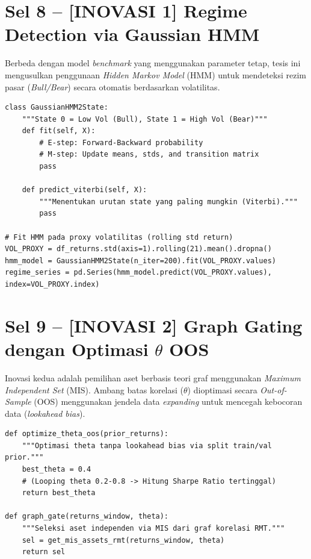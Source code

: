 \documentclass[12pt,a4paper]{article}
\begin{document}
\section{Sel 8 -- [INOVASI 1] Regime Detection via Gaussian HMM}
Berbeda dengan model \textit{benchmark} yang menggunakan parameter tetap, tesis ini mengusulkan penggunaan \textit{Hidden Markov Model} (HMM) untuk mendeteksi rezim pasar (\textit{Bull/Bear}) secara otomatis berdasarkan volatilitas.

\begin{lstlisting}[caption={Implementasi Gaussian HMM 2-state (Baum-Welch)}]
class GaussianHMM2State:
    """State 0 = Low Vol (Bull), State 1 = High Vol (Bear)"""
    def fit(self, X):
        # E-step: Forward-Backward probability
        # M-step: Update means, stds, and transition matrix
        pass

    def predict_viterbi(self, X):
        """Menentukan urutan state yang paling mungkin (Viterbi)."""
        pass

# Fit HMM pada proxy volatilitas (rolling std return)
VOL_PROXY = df_returns.std(axis=1).rolling(21).mean().dropna()
hmm_model = GaussianHMM2State(n_iter=200).fit(VOL_PROXY.values)
regime_series = pd.Series(hmm_model.predict(VOL_PROXY.values), index=VOL_PROXY.index)
\end{lstlisting}

\section{Sel 9 -- [INOVASI 2] Graph Gating dengan Optimasi $\theta$ OOS}
Inovasi kedua adalah pemilihan aset berbasis teori graf menggunakan \textit{Maximum Independent Set} (MIS). Ambang batas korelasi ($\theta$) dioptimasi secara \textit{Out-of-Sample} (OOS) menggunakan jendela data \textit{expanding} untuk mencegah kebocoran data (\textit{lookahead bias}).

\begin{lstlisting}[caption={Optimasi parameter graf secara OOS}]
def optimize_theta_oos(prior_returns):
    """Optimasi theta tanpa lookahead bias via split train/val prior."""
    best_theta = 0.4
    # (Looping theta 0.2-0.8 -> Hitung Sharpe Ratio tertinggal)
    return best_theta

def graph_gate(returns_window, theta):
    """Seleksi aset independen via MIS dari graf korelasi RMT."""
    sel = get_mis_assets_rmt(returns_window, theta)
    return sel
\end{lstlisting}
\end{document}
